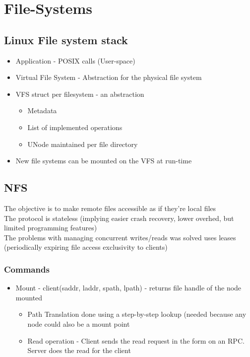 \documentclass[a4paper]{article}
\begin{document}
\newpage

\section{File-Systems}

\subsection{Linux File system stack}

\begin{itemize}
\item
    Application - POSIX calls (User-space)
\item
    Virtual File System - Abstraction for the physical file system
\item
    VFS struct per filesystem - an abstraction

    \begin{itemize}
        \item
        Metadata
    \item
        List of implemented operations
    \item
        UNode maintained per file directory
    \end{itemize}
\item
    New file systems can be mounted on the VFS at run-time
\end{itemize}

\subsection{NFS}
The objective is to make remote files accessible as if they're local
files\\
The protocol is stateless (implying easier crash recovery, lower
overhed, but limited programming features)\\
The problems with managing concurrent writes/reads was solved uses
leases (periodically expiring file access exclusivity to clients)

\subsubsection{Commands}

\begin{itemize}
\item
    Mount - client(saddr, laddr, spath, lpath) - returns file handle of
    the node mounted

    \begin{itemize}
        \item
        Path Translation done using a step-by-step lookup (needed because
        any node could also be a mount point
    \item
        Read operation - Client sends the read request in the form on an
        RPC. Server does the read for the client
    \end{itemize}
\end{itemize}
\end{document}
